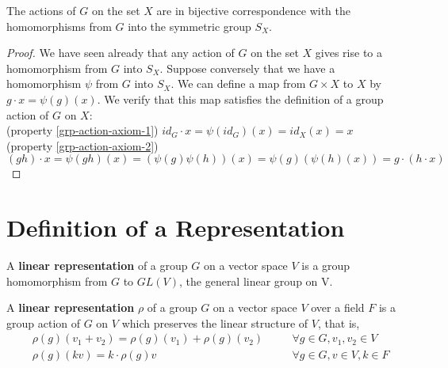 \begin{prop} 
The actions of $G$ on the set $X$ are in bijective correspondence with the homomorphisms from $G$ into the symmetric group $S_X$.
\end{prop}
\begin{proof}
We have seen already that any action of $G$ on the set $X$ gives rise to a homomorphism from $G$ into $S_X$.  Suppose conversely that we have a homomorphism $\psi$ from $G$ into $S_X$.  We can define a map from $G \times X$ to $X$  by $g \cdot x = \psi(g)(x)$. We verify that this map satisfies the definition of a group action of $G$ on $X$:
\\ (property \ref{grp-action-axiom-1}) \quad $id_G \cdot x = \psi(id_G)(x) = id_X(x) = x$
\\(property \ref{grp-action-axiom-2}) \quad $(gh) \cdot x = \psi(gh)(x) = (\psi(g)\psi(h))(x) = \psi(g)(\psi(h)(x)) = g \cdot (h \cdot x)$
\end{proof}


\section{Definition of a Representation}
\begin{defn}
\label{repdef1}
A \textbf{linear representation} of a group $G$ on a vector space $V$  is a group homomorphism from $G$ to $GL(V)$, the general linear group on V. \end{defn}
 

\begin{defn}\label{repdef2}A \textbf{linear representation} $\rho$ of a group $G$ on a vector space $V$ over a field $F$ is a group action of $G$ on $V$ which preserves the linear structure of $V$, that is, 
\begin{align}
\label{rep-axiom-1}&\rho(g)(v_1+v_2)=\rho(g)(v_1)+\rho(g)(v_2) \quad && \forall g \in G, v_1, v_2 \in V \\
\label{rep-axiom-2}&\rho(g)(kv) = k \cdot \rho(g)v \quad && \forall g \in G, v \in V, k \in F
\end{align}
 \end{defn}
 
